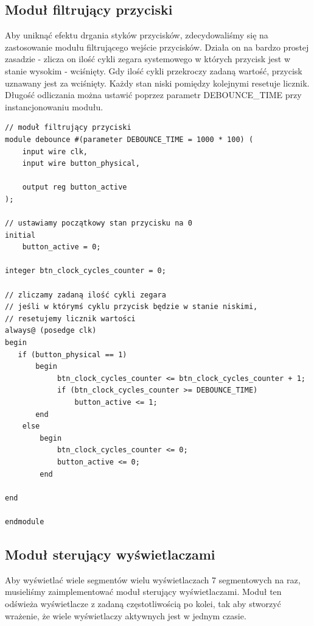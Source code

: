 \documentclass[a4paper]{article}
\begin{document}
\subsection{Moduł filtrujący przyciski}
Aby uniknąć efektu drgania styków przycisków, zdecydowaliśmy się na zastosowanie modułu
filtrującego wejście przycisków. Działa on na bardzo prostej zasadzie - zlicza on ilość 
cykli zegara systemowego w których przycisk jest w stanie wysokim - wciśnięty. Gdy ilość
cykli przekroczy zadaną wartość, przycisk uznawany jest za wciśnięty. Każdy stan niski 
pomiędzy kolejnymi resetuje licznik. Długość odliczania można ustawić poprzez
parametr DEBOUNCE\_TIME przy instancjonowaniu modułu.
\begin{verbatim}
// moduł filtrujący przyciski
module debounce #(parameter DEBOUNCE_TIME = 1000 * 100) (
    input wire clk,
    input wire button_physical,
    
    output reg button_active
);

// ustawiamy początkowy stan przycisku na 0
initial
    button_active = 0;

integer btn_clock_cycles_counter = 0;

// zliczamy zadaną ilość cykli zegara 
// jeśli w którymś cyklu przycisk będzie w stanie niskimi,
// resetujemy licznik wartości
always@ (posedge clk)
begin
   if (button_physical == 1)
       begin
            btn_clock_cycles_counter <= btn_clock_cycles_counter + 1;
            if (btn_clock_cycles_counter >= DEBOUNCE_TIME) 
                button_active <= 1;
       end
    else 
        begin
            btn_clock_cycles_counter <= 0;
            button_active <= 0;
        end
        
end

endmodule
\end{verbatim}
\pagebreak
\subsection{Moduł sterujący wyświetlaczami}
Aby wyświetlać wiele segmentów wielu wyświetlaczach 7 segmentowych na raz,
musieliśmy zaimplementować moduł sterujący wyświetlaczami. Moduł ten 
odświeża wyświetlacze z zadaną częstotliwością po kolei, tak aby 
stworzyć wrażenie, że wiele wyświetlaczy aktywnych jest w jednym czasie.
\end{document}

